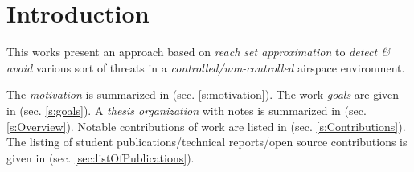 \cleardoublepage
\chapter{Introduction}\label{ch:introduction}

\noindent This works present an approach based on \emph{reach set approximation} to \emph{detect \& avoid} various sort of threats in a \emph{controlled/non-controlled} airspace environment. 

The \emph{motivation} is summarized in (sec. \ref{s:motivation}). The work \emph{goals} are given in (sec. \ref{s:goals}). A \emph{thesis organization} with notes is summarized in (sec. \ref{s:Overview}). Notable contributions of work are listed in (sec. \ref{s:Contributions}). The listing of student publications/technical reports/open source contributions is given in (sec. \ref{sec:listOfPublications}).